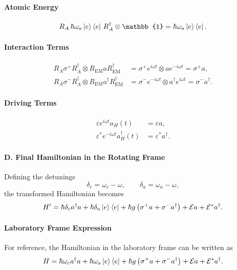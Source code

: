 \paragraph{Atomic Energy}
\begin{equation}
R_A \, \hbar \omega_a \ket{e}\bra{e} \, R_A^\dagger \otimes \mathbb{1}
=
\hbar \omega_a \ket{e}\bra{e}.
\end{equation}

\paragraph{Interaction Terms}
\begin{align}
R_A \sigma^+ R_A^\dagger \otimes R_{\mathrm{EM}} a R_{\mathrm{EM}}^\dagger
&=
\sigma^+ e^{i\omega t} \otimes a e^{-i\omega t}
=
\sigma^+ a , \\
R_A \sigma^- R_A^\dagger \otimes R_{\mathrm{EM}} a^\dagger R_{\mathrm{EM}}^\dagger
&=
\sigma^- e^{-i\omega t} \otimes a^\dagger e^{i\omega t}
=
\sigma^- a^\dagger .
\end{align}

\paragraph{Driving Terms}
\begin{align}
\varepsilon e^{i\omega t} a_H(t) &= \varepsilon a , \\
\varepsilon^* e^{-i\omega t} a_H^\dagger(t) &= \varepsilon^* a^\dagger .
\end{align}

\paragraph{D. Final Hamiltonian in the Rotating Frame}

Defining the detunings
\[
\delta_c = \omega_c - \omega,
\qquad
\delta_a = \omega_a - \omega,
\]
the transformed Hamiltonian becomes
\begin{equation}\label{eq:rwaham}
H'
=
\hbar \delta_c a^\dagger a
+
\hbar \delta_a \ket{e}\bra{e}
+
\hbar g \left( \sigma^+ a + \sigma^- a^\dagger \right)
+
\mathcal{E} a
+
\mathcal{E}^* a^\dagger .
\end{equation}

\paragraph{Laboratory Frame Expression}

For reference, the Hamiltonian in the laboratory frame can be written as
\begin{equation}
H
=
\hbar \omega_c a^\dagger a
+
\hbar \omega_a \ket{e}\bra{e}
+
\hbar g \left( \sigma^+ a + \sigma^- a^\dagger \right)
+
\mathcal{E} a
+
\mathcal{E}^* a^\dagger .
\end{equation}

